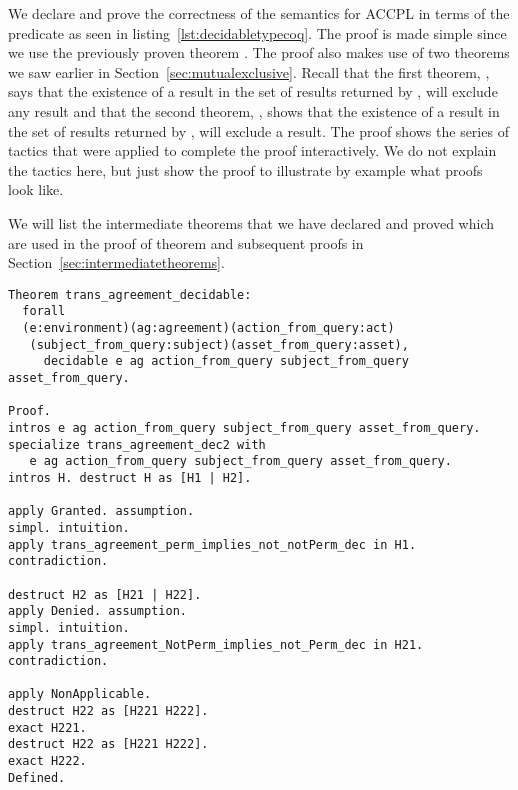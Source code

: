 We declare and prove the correctness of the semantics for \ac{ACCPL} in terms of the  predicate as seen in listing~\ref{lst:decidabletypecoq}. The proof is made simple since we use the previously proven theorem . The proof also makes use of two theorems we saw earlier in Section~\ref{sec:mutualexclusive}. Recall that the first theorem, , says that the existence of a  result in the set of results returned by , will exclude any  result and that the second theorem, , shows that the existence of a  result in the set of results returned by , will exclude a  result. The proof shows the series of tactics that were applied to 
complete the proof interactively. We do not explain the tactics here, but just show the proof to illustrate by example what proofs look like.

We will list the intermediate theorems that we have declared and proved which are used in the proof of theorem  and subsequent proofs in Section~\ref{sec:intermediatetheorems}.

\begin{lstlisting}
Theorem trans_agreement_decidable:
  forall
  (e:environment)(ag:agreement)(action_from_query:act)
   (subject_from_query:subject)(asset_from_query:asset),
     decidable e ag action_from_query subject_from_query asset_from_query.

Proof.
intros e ag action_from_query subject_from_query asset_from_query.
specialize trans_agreement_dec2 with 
   e ag action_from_query subject_from_query asset_from_query.
intros H. destruct H as [H1 | H2].

apply Granted. assumption.
simpl. intuition.
apply trans_agreement_perm_implies_not_notPerm_dec in H1. contradiction. 

destruct H2 as [H21 | H22].
apply Denied. assumption.
simpl. intuition.
apply trans_agreement_NotPerm_implies_not_Perm_dec in H21. contradiction. 

apply NonApplicable. 
destruct H22 as [H221 H222].
exact H221.
destruct H22 as [H221 H222].
exact H222.
Defined.
\end{lstlisting}

